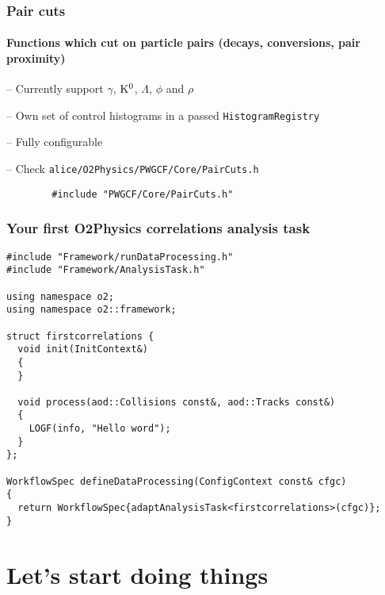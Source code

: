 \documentclass[14pt,aspectratio=169,t]{beamer}
\begin{document}
\begin{frame}[fragile]
  \frametitle{Pair cuts}
  \framesubtitle{Functions which cut on particle pairs (decays, conversions, pair proximity)}
  -- {\color{blue} Currently support $\gamma$, ${\rm K}^{0}$, $\Lambda$, $\phi$ and $\rho$}\par
  \vspace{0.1in}
  -- {\color{blue} Own set of control histograms in a passed \texttt{HistogramRegistry}}\par
  \vspace{0.1in}
  -- {\color{blue} Fully configurable}\par
  \vspace{0.1in}
  -- {\color{blue}Check} {\small \texttt{alice/O2Physics/PWGCF/Core/PairCuts.h}}\par
  \vspace{0.1in}
  {\small\color{blue}
  \begin{verbatim}
        #include "PWGCF/Core/PairCuts.h"
  \end{verbatim}}
\end{frame}

\begin{frame}[fragile]
  \frametitle{Your first O2Physics correlations analysis task}
  \vspace{-0.1in}
  {\scriptsize \color{blue}
  \begin{verbatim}
#include "Framework/runDataProcessing.h"
#include "Framework/AnalysisTask.h"

using namespace o2;
using namespace o2::framework;

struct firstcorrelations {
  void init(InitContext&)
  {
  }

  void process(aod::Collisions const&, aod::Tracks const&)
  {
    LOGF(info, "Hello word");
  }
};

WorkflowSpec defineDataProcessing(ConfigContext const& cfgc)
{
  return WorkflowSpec{adaptAnalysisTask<firstcorrelations>(cfgc)};
}
  \end{verbatim}
  }
\end{frame}

\section{Let's start doing things}
\end{document}
